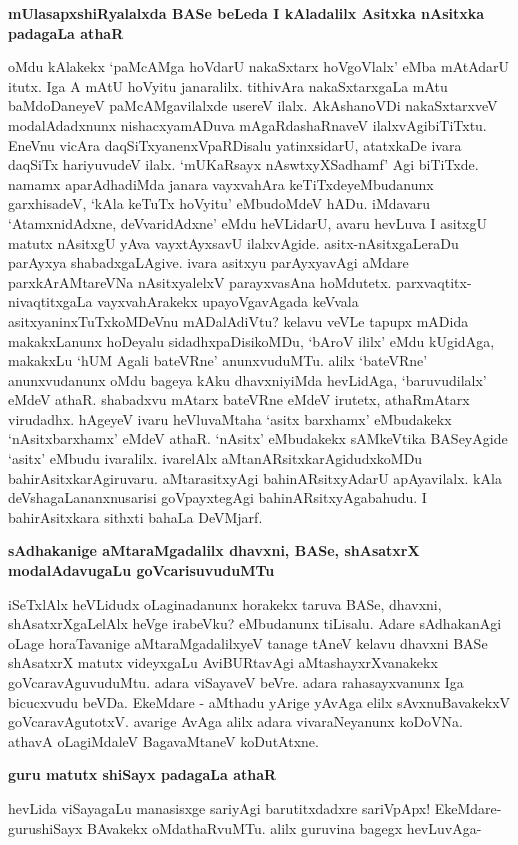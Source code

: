 {\bf mUlasapxshiRyalalxda BASe beLeda I kAladalilx Asitxka nAsitxka padagaLa athaR}

oMdu kAlakekx `paMcAMga hoVdarU nakaSxtarx hoVgoVlalx' eMba mAtAdarU itutx. Iga A mAtU hoVyitu janaralilx. tithivAra nakaSxtarxgaLa mAtu baMdoDaneyeV paMcAMgavilalxde usereV ilalx. AkAshanoVDi nakaSxtarxveV modalAdadxnunx nishacxyamADuva mAgaRdashaRnaveV ilalxvAgibiTiTxtu. EneVnu vicAra daqSiTxyanenxVpaRDisalu yatinxsidarU, atatxkaDe ivara daqSiTx hariyuvudeV ilalx. `mUKaRsayx nAswtxyXSadhamf' Agi biTiTxde. namamx aparAdhadiMda janara vayxvahAra keTiTxdeyeMbudanunx garxhisadeV, `kAla keTuTx hoVyitu' eMbudoMdeV hADu. iMdavaru `AtamxnidAdxne, deVvaridAdxne' eMdu heVLidarU, avaru hevLuva I asitxgU matutx nAsitxgU yAva vayxtAyxsavU ilalxvAgide. asitx-nAsitxgaLeraDu parAyxya shabadxgaLAgive. ivara asitxyu parAyxyavAgi aMdare parxkArAMtareVNa nAsitxyalelxV parayxvasAna hoMdutetx. parxvaqtitx-nivaqtitxgaLa vayxvahArakekx upayoVgavAgada keVvala asitxyaninxTuTxkoMDeVnu mADalAdiVtu? kelavu veVLe tapupx mADida makakxLanunx hoDeyalu sidadhxpaDisikoMDu, `bAroV ililx' eMdu kUgidAga, makakxLu `hUM Agali bateVRne' anunxvuduMTu. alilx `bateVRne' anunxvudanunx oMdu bageya kAku dhavxniyiMda hevLidAga, `baruvudilalx' eMdeV athaR. shabadxvu mAtarx bateVRne eMdeV irutetx, athaRmAtarx virudadhx. hAgeyeV ivaru heVluvaMtaha `asitx barxhamx' eMbudakekx `nAsitxbarxhamx' eMdeV athaR. `nAsitx' eMbudakekx sAMkeVtika BASeyAgide `asitx' eMbudu ivaralilx. ivarelAlx aMtanARsitxkarAgidudxkoMDu bahirAsitxkarAgiruvaru. aMtarasitxyAgi bahinARsitxyAdarU apAyavilalx. kAla deVshagaLananxnusarisi goVpayxtegAgi bahinARsitxyAgabahudu. I bahirAsitxkara sithxti bahaLa DeVMjarf.

{\bf sAdhakanige aMtaraMgadalilx dhavxni, BASe, shAsatxrX modalAdavugaLu goVcarisuvuduMTu}

iSeTxlAlx heVLidudx oLaginadanunx horakekx taruva BASe, dhavxni, shAsatxrXgaLelAlx heVge irabeVku? eMbudanunx tiLisalu. Adare sAdhakanAgi oLage horaTavanige aMtaraMgadalilxyeV tanage tAneV kelavu dhavxni BASe shAsatxrX matutx videyxgaLu AviBURtavAgi aMtashayxrXvanakekx goVcaravAguvuduMtu. adara viSayaveV beVre. adara rahasayxvanunx Iga bicucxvudu beVDa. EkeMdare - aMthadu yArige yAvAga elilx sAvxnuBavakekxV goVcaravAgutotxV. avarige AvAga alilx adara vivaraNeyanunx koDoVNa. athavA oLagiMdaleV BagavaMtaneV koDutAtxne.

{\bf guru matutx shiSayx padagaLa athaR}

hevLida viSayagaLu manasisxge sariyAgi barutitxdadxre sariVpApx! EkeMdare- gurushiSayx BAvakekx oMdathaRvuMTu. alilx guruvina bagegx hevLuvAga-


